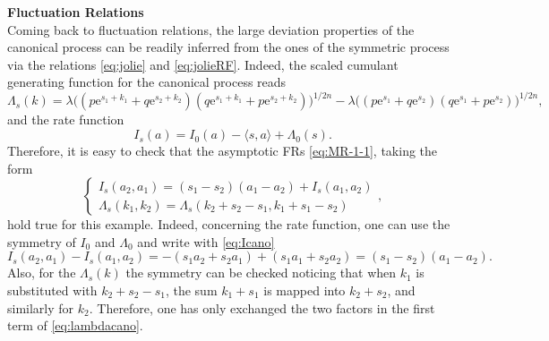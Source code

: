 \documentclass[a4paper,11pt]{article}
\numberwithin{equation}{section}
\begin{document}
\noindent
\textbf{Fluctuation Relations} \\
\noindent 
Coming back to fluctuation relations, the large deviation properties of the canonical process can be readily inferred from the ones of the symmetric process via the relations \eqref{eq:jolie} and \eqref{eq:jolieRF}.
Indeed, the scaled cumulant generating function for the canonical process reads
\begin{equation}\label{eq:lambdacano}
    \Lambda_s(k) = \lambda \Big( (p \mathrm{e}^{s_1 + k_1} + q \mathrm{e}^{s_2 + k_2})(q \mathrm{e}^{s_1 + k_1} + p \mathrm{e}^{s_2 +k_2}) \Big)^{1/2n} -\lambda \Big( (p \mathrm{e}^{s_1} + q \mathrm{e}^{s_2})(q \mathrm{e}^{s_1} + p \mathrm{e}^{s_2}) \Big)^{1/2n},
\end{equation}
and the rate function 
\begin{equation}\label{eq:Icano}
I_s(a) = I_0(a) - \langle s, a \rangle + \Lambda_0(s).  
\end{equation}    
Therefore, it is easy to check that the asymptotic FRs \eqref{eq:MR-1-1}, taking the form 
\begin{equation}\label{eq:MR-1-1-1}
\begin{cases}
I_s \left(a_{2},a_{1}\right)= \left(s_{1}-s_{2}\right)\left(a_{1}-a_{2}\right) +I_s\left(a_{1},a_{2}\right) \\
\Lambda_s \left( k_{1},k_{2} \right) = \Lambda_s \left( k_{2}+s_{2}-s_{1},k_{1}+s_{1}-s_{2}\right) 
\end{cases},
\end{equation}
hold true for this example. Indeed, concerning the rate function, one can use the symmetry of $I_0$ and  $\Lambda_0$ and write  with \eqref{eq:Icano} 
\begin{equation*}
   I_s \left(a_{2},a_{1}\right) - I_s \left(a_{1},a_{2}\right) = -(s_1 a_2 + s_2 a_1) + (s_1 a_1 + s_2 a_2) = \left(s_{1}-s_{2}\right)\left(a_{1}-a_{2}\right).
\end{equation*}
Also, for the $\Lambda_s(k)$ the symmetry can be checked noticing that when $k_1$ is substituted with $ k_2+s_2-s_1$, the sum $k_1+s_1$ is mapped into $k_2+s_2$, and similarly for $k_2$. Therefore, one has only exchanged the two factors in the first term of \eqref{eq:lambdacano}.
\end{document}
